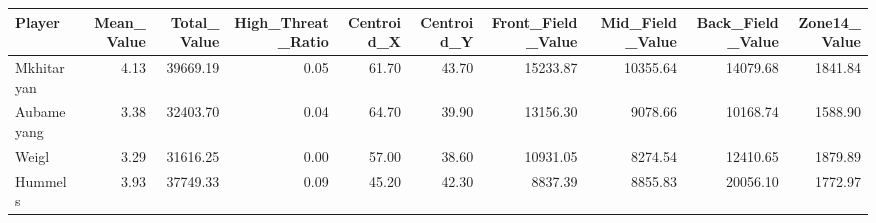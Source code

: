 \begin{table}[ht]
\centering
\begin{tabular}{lrrrrrrrrr}
  \hline
Player & Mean_Value & Total_Value & High_Threat_Ratio & Centroid_X & Centroid_Y & Front_Field_Value & Mid_Field_Value & Back_Field_Value & Zone14_Value \\ 
  \hline
Mkhitaryan & 4.13 & 39669.19 & 0.05 & 61.70 & 43.70 & 15233.87 & 10355.64 & 14079.68 & 1841.84 \\ 
  Aubameyang & 3.38 & 32403.70 & 0.04 & 64.70 & 39.90 & 13156.30 & 9078.66 & 10168.74 & 1588.90 \\ 
  Weigl & 3.29 & 31616.25 & 0.00 & 57.00 & 38.60 & 10931.05 & 8274.54 & 12410.65 & 1879.89 \\ 
  Hummels & 3.93 & 37749.33 & 0.09 & 45.20 & 42.30 & 8837.39 & 8855.83 & 20056.10 & 1772.97 \\ 
   \hline
\end{tabular}
\end{table}
